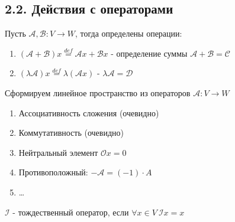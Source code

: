 \documentclass[12pt]{article}
\begin{document}
    \subsection[p2\_2]{2.2. Действия с операторами}

    \Def Пусть $\mathcal{A}, \mathcal{B}: V \rightarrow W$, тогда определены операции:

    \begin{enumerate}
        \item $(\mathcal{A} + \mathcal{B})x \stackrel{def}{=} \mathcal{A}x + \mathcal{B}x$ - определение суммы $\mathcal{A} + \mathcal{B} = \mathcal{C}$
        \item $(\lambda\mathcal{A})x \stackrel{def}{=} \lambda(\mathcal{A}x)$ - $\lambda\mathcal{A} = \mathcal{D}$
    \end{enumerate}

    \Nota Сформируем линейное пространство из операторов $\mathcal{A}: V \rightarrow W$

    \begin{enumerate}
        \item Ассоциативность сложения (очевидно)
        \item Коммутативность (очевидно)
        \item Нейтральный элемент $\mathcal{O}x = 0$
        \item Противоположный: $-\mathcal{A} = (-1) \cdot A$
        \item \dots \Lab
    \end{enumerate}

    \Def $\mathcal{I}$ - тождественный оператор, если $\forall x \in V \ \mathcal{I}x = x$
\end{document}
